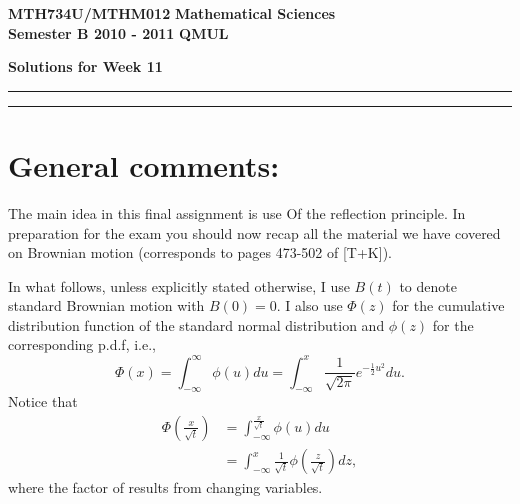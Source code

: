 \documentclass[11pt,a4paper]{article}
\begin{document}
  \textbf{MTH734U/MTHM012} \hfill \textbf{Mathematical Sciences}\\
  \textbf{Semester B 2010 - 2011} \hfill \textbf{QMUL}
  \begin{center}
    \textbf{\huge Solutions for Week 11}
  \end{center}
  \hrule \vspace{2mm} \hrule

  \section*{General comments:}
  The main idea in this final assignment is use Of the reflection principle. In preparation for the exam you should now recap all the material we have covered on Brownian motion (corresponds to pages 473-502 of [T+K]).\par 
  In what follows, unless explicitly stated otherwise, I use $B(t)$ to denote standard Brownian motion with $B(0) = 0$. I also use $\Phi(z)$ for the cumulative distribution function of the standard normal distribution and $\phi(z)$ for the corresponding p.d.f, i.e.,
  $$
  \Phi(x) = \int_{-\infty}^\infty\phi(u)du = \int_{-\infty}^x\frac{1}{\sqrt{2\pi}}e^{-\frac{1}{2}u^2}du.
  $$
  Notice that
  \begin{align*}
    \Phi\left(\frac{x}{\sqrt{t}}\right) 
    &= \int_{-\infty}^\frac{x}{\sqrt{t}}\phi(u)du\\
    &= \int_{-\infty}^x\frac{1}{\sqrt{t}}\phi\left(\frac{z}{\sqrt{t}}\right)dz,
  \end{align*}
  where the factor of results from changing variables.
  
\end{document}
